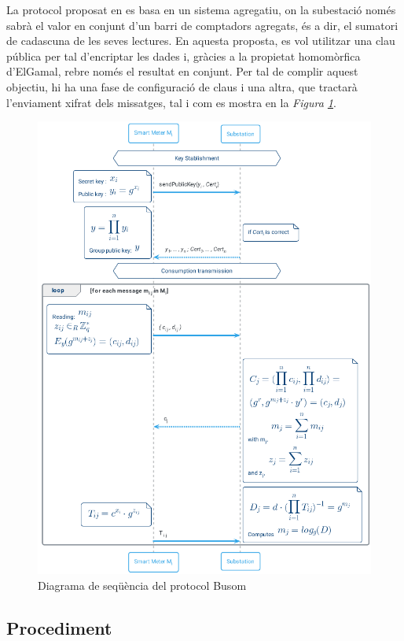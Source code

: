 

La protocol proposat en \cite{busom} es basa en un sistema agregatiu, on la subestació només sabrà el valor en conjunt d'un barri de comptadors agregats, és a dir, el sumatori de cadascuna de les seves lectures. En aquesta proposta, es vol utilitzar una clau pública per tal d'encriptar les dades i, gràcies a la propietat homomòrfica d'ElGamal, rebre només el resultat en conjunt. Per tal de complir aquest objectiu, hi ha una fase de configuració de claus i una altra, que tractarà l'enviament xifrat dels missatges, tal i com es mostra en la \textit{Figura \ref{fig:busom}}.
\begin{figure}[H]
	\centering
	\includegraphics[width=14cm]{umls/busom.png}
	\caption{Diagrama de seqüència del protocol Busom}
	\label{fig:busom}
\end{figure}

\subsection{Procediment}
